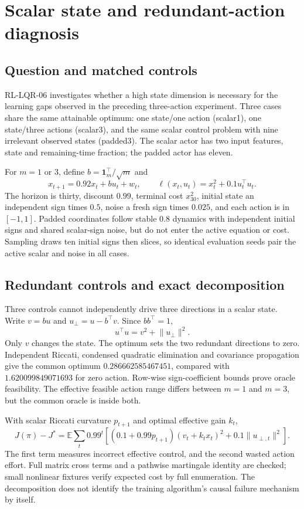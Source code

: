 \chapter{Scalar state and redundant-action diagnosis}
\label{sec:lqr-scalar-state}

\section{Question and matched controls}
RL-LQR-06 investigates whether a high state dimension is necessary for the
learning gaps observed in the preceding three-action experiment. Three
cases share the same attainable optimum: one state/one action (scalar1), one
state/three actions (scalar3), and the same scalar control problem with nine
irrelevant observed states (padded3). The scalar actor has two input features,
state and remaining-time fraction; the padded actor has eleven.

For $m=1$ or $3$, define $b=\mathbf 1_m^\top/\sqrt m$ and
\[
 x_{t+1}=0.92x_t+bu_t+w_t,\qquad
 \ell(x_t,u_t)=x_t^2+0.1u_t^\top u_t.
\]
The horizon is thirty, discount $0.99$, terminal cost $x_{30}^2$, initial
state an independent sign times $0.5$, noise a fresh sign times $0.025$,
and each action is in $[-1,1]$. Padded coordinates follow stable $0.8$ dynamics
with independent initial signs and shared scalar-sign noise, but do not enter
the active equation or cost. Sampling draws ten initial signs then slices,
so identical evaluation seeds pair the active scalar and noise in all cases.

\section{Redundant controls and exact decomposition}
Three controls cannot independently drive three directions in a scalar state.
Write $v=bu$ and $u_\perp=u-b^\top v$. Since $bb^\top=1$,
\[
 u^\top u=v^2+\lVert u_\perp\rVert^2.
\]
Only $v$ changes the state. The optimum sets the two redundant directions to
zero. Independent Riccati, condensed quadratic elimination and covariance
propagation give the common optimum $0.286662585467451$, compared with
$1.620099849071693$ for zero action. Row-wise sign-coefficient bounds prove
oracle feasibility. The effective feasible action range differs between
$m=1$ and $m=3$, but the common oracle is inside both.

With scalar Riccati curvature $p_{t+1}$ and optimal effective gain $k_t$,
\[
 J(\pi)-J^*=\mathbb E\sum_t0.99^t\left[
 (0.1+0.99p_{t+1})(v_t+k_tx_t)^2+0.1\lVert u_{\perp,t}\rVert^2\right].
\]
The first term measures incorrect effective control, and the second wasted
action effort. Full matrix cross terms and a pathwise martingale identity
are checked; small nonlinear fixtures verify expected cost by full enumeration.
The decomposition does not identify the training algorithm's causal failure
mechanism by itself.

